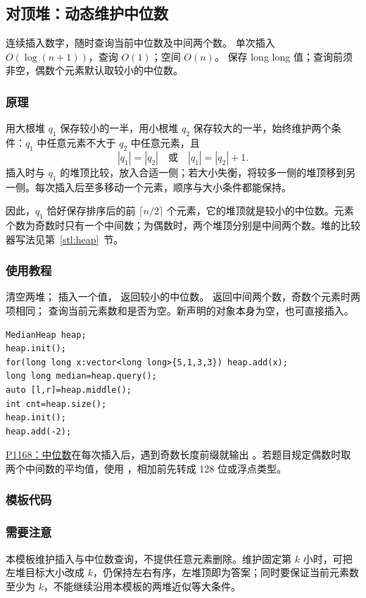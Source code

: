 \subsection{对顶堆：动态维护中位数}
\label{ds:median-heap}
\AlgorithmInfo
    {连续插入数字，随时查询当前中位数及中间两个数。}
    {单次插入 $O(\log(n+1))$，查询 $O(1)$；空间 $O(n)$。}
    {保存 long long 值；查询前须非空，偶数个元素默认取较小的中位数。}
\subsubsection*{原理}
用大根堆 $q_1$ 保存较小的一半，用小根堆 $q_2$ 保存较大的一半，始终维护两个条件：$q_1$ 中任意元素不大于 $q_2$ 中任意元素，且
\[
 |q_1|=|q_2|\quad\text{或}\quad |q_1|=|q_2|+1.
\]
插入时与 $q_1$ 的堆顶比较，放入合适一侧；若大小失衡，将较多一侧的堆顶移到另一侧。每次插入后至多移动一个元素，顺序与大小条件都能保持。

因此，$q_1$ 恰好保存排序后的前 $\lceil n/2\rceil$ 个元素，它的堆顶就是较小的中位数。元素个数为奇数时只有一个中间数；为偶数时，两个堆顶分别是中间两个数。堆的比较器写法见第~\ref{stl:heap}~节。
\subsubsection*{使用教程}
 清空两堆； 插入一个值， 返回较小的中位数。 返回中间两个数，奇数个元素时两项相同； 查询当前元素数和是否为空。新声明的对象本身为空，也可直接插入。
\begin{lstlisting}[style=mtycpp,numbers=none]
MedianHeap heap;
heap.init();
for(long long x:vector<long long>{5,1,3,3}) heap.add(x);
long long median=heap.query();
auto [l,r]=heap.middle();
int cnt=heap.size();
heap.init();
heap.add(-2);
\end{lstlisting}
\href{https://www.luogu.com.cn/problem/P1168}{P1168：中位数}在每次插入后，遇到奇数长度前缀就输出 。若题目规定偶数时取两个中间数的平均值，使用 ，相加前先转成 128 位或浮点类型。
\subsubsection*{模板代码}
\subsubsection*{需要注意}
本模板维护插入与中位数查询，不提供任意元素删除。维护固定第 $k$ 小时，可把左堆目标大小改成 $k$，仍保持左右有序，左堆顶即为答案；同时要保证当前元素数至少为 $k$，不能继续沿用本模板的两堆近似等大条件。
